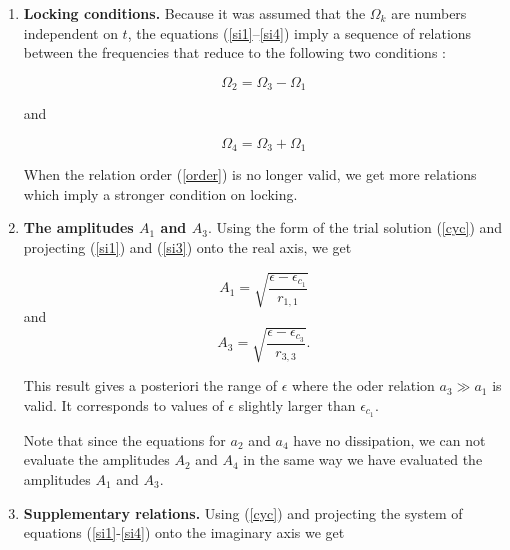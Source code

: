 \begin{enumerate}
\item {\bf Locking conditions.} Because it was assumed
that the $\Omega_k$ are numbers independent on $t$,
the equations (\ref{si1}--\ref{si4}) imply a sequence of relations between
the frequencies that reduce to the following two conditions :

\begin{equation}\label{reom1}
\Omega_2=\Omega_3-\Omega_1
\end{equation}

and 

\begin{equation}\label{reom2}
\Omega_4=\Omega_3+\Omega_1
\end{equation}

\begin{rem}
When the relation order (\ref{order}) 
is no longer valid, we get more relations
which imply a stronger condition on locking.
\end{rem}

\item {\bf The amplitudes $A_1$ and $A_3$}. 
Using the form of the trial solution
(\ref{cyc}) and projecting (\ref{si1}) and (\ref{si3}) onto the real
axis, we get 

\begin{equation}\label{a1}
A_1=\sqrt{\frac{\epsilon-\epsilon_{c_1}}{r_{1,1}}}
\end{equation}
and
\begin{equation}\label{a2}
A_3=\sqrt{\frac{\epsilon-\epsilon_{c_3}}{r_{3,3}}}.
\end{equation}

\begin{rem}
This result gives a posteriori the range of $\epsilon$ where the
oder relation  $a_3\gg a_1$ is valid. It corresponds to  values of
$\epsilon$ slightly larger than $\epsilon_{c_1}$. 
\end{rem}

\begin{rem}
Note that since the equations for $a_2$ and $a_4$ have no
dissipation, we can not evaluate the amplitudes $A_2$ and $A_4$
in the same way we have evaluated the amplitudes $A_1$ and $A_3$.
\end{rem}


\item {\bf Supplementary relations.} Using  (\ref{cyc})
and projecting the system of equations (\ref{si1}-\ref{si4}) onto the 
imaginary axis we get



\end{enumerate}
